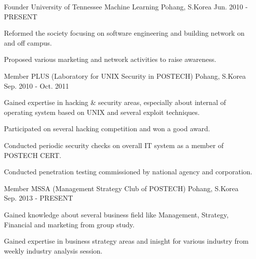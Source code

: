 \begin{cventries}
  \cventry
    {Founder}
    {University of Tennessee Machine Learning}
    {Pohang, S.Korea}
    {Jun. 2010 - PRESENT}
    {
      \begin{cvitems}
        \item {Reformed the society focusing on software engineering and building network on and off campus.}
        \item {Proposed various marketing and network activities to raise awareness.}
      \end{cvitems}
    }
  \cventry
    {Member}
    {PLUS (Laboratory for UNIX Security in POSTECH)}
    {Pohang, S.Korea}
    {Sep. 2010 - Oct. 2011}
    {
      \begin{cvitems}
        \item {Gained expertise in hacking \& security areas, especially about internal of operating system based on UNIX and several exploit techniques.}
        \item {Participated on several hacking competition and won a good award.}
        \item {Conducted periodic security checks on overall IT system as a member of POSTECH CERT.}
        \item {Conducted penetration testing commissioned by national agency and corporation.}
      \end{cvitems}
    }
  \cventry
    {Member}
    {MSSA (Management Strategy Club of POSTECH)}
    {Pohang, S.Korea}
    {Sep. 2013 - PRESENT}
    {
      \begin{cvitems}
        \item {Gained knowledge about several business field like Management, Strategy, Financial and marketing from group study.}
        \item {Gained expertise in business strategy areas and inisght for various industry from weekly industry analysis session.}
      \end{cvitems}
    }
\end{cventries}
